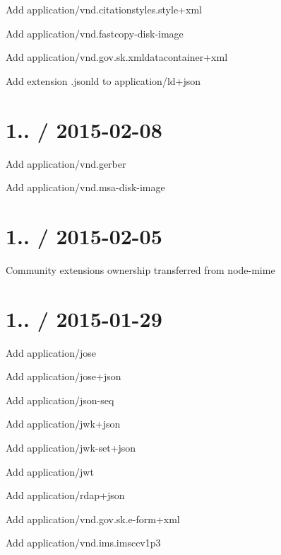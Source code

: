 
\begin{DoxyItemize}
\item Add {\ttfamily application/vnd.\+citationstyles.\+style+xml}
\item Add {\ttfamily application/vnd.\+fastcopy-\/disk-\/image}
\item Add {\ttfamily application/vnd.\+gov.\+sk.\+xmldatacontainer+xml}
\item Add extension {\ttfamily .jsonld} to {\ttfamily application/ld+json}
\end{DoxyItemize}

\section*{1.. / 2015-\/02-\/08 }


\begin{DoxyItemize}
\item Add {\ttfamily application/vnd.\+gerber}
\item Add {\ttfamily application/vnd.\+msa-\/disk-\/image}
\end{DoxyItemize}

\section*{1.. / 2015-\/02-\/05 }


\begin{DoxyItemize}
\item Community extensions ownership transferred from {\ttfamily node-\/mime}
\end{DoxyItemize}

\section*{1.. / 2015-\/01-\/29 }


\begin{DoxyItemize}
\item Add {\ttfamily application/jose}
\item Add {\ttfamily application/jose+json}
\item Add {\ttfamily application/json-\/seq}
\item Add {\ttfamily application/jwk+json}
\item Add {\ttfamily application/jwk-\/set+json}
\item Add {\ttfamily application/jwt}
\item Add {\ttfamily application/rdap+json}
\item Add {\ttfamily application/vnd.\+gov.\+sk.\+e-\/form+xml}
\item Add {\ttfamily application/vnd.\+ims.\+imsccv1p3}
\end{DoxyItemize}

